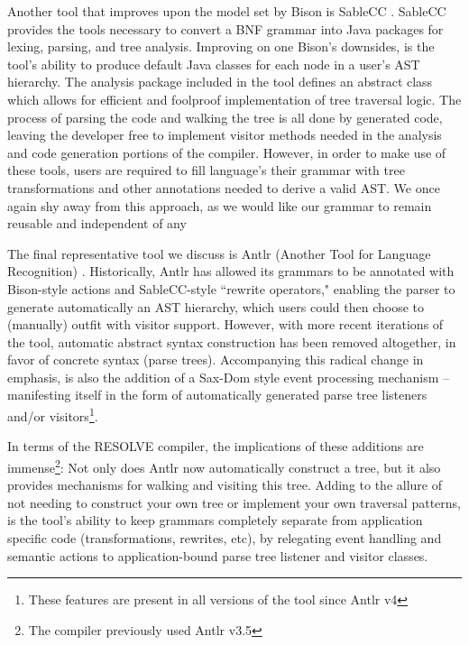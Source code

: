 \documentclass[times]{speauth}
\begin{document}
Another tool that improves upon the model set by Bison is SableCC \cite{gagnon:1998}. SableCC provides the tools necessary to convert a BNF grammar into Java packages for lexing, parsing, and tree analysis. Improving on one Bison's downsides, is the tool's ability to produce default Java classes for each node in a user's AST hierarchy. The analysis package included in the tool defines an abstract class which allows for efficient and foolproof implementation of tree traversal logic. The process of parsing the code and walking the tree is all done by generated code, leaving the developer free to implement visitor methods needed in the analysis and code generation portions of the compiler. However, in order to make use of these tools, users are required to fill language's their grammar with tree transformations and other annotations needed to derive a valid AST. We once again shy away from this approach, as we would like our grammar to remain reusable and independent of any


The final representative tool we discuss is Antlr (Another Tool for Language Recognition) \cite{parr:2011}. Historically, Antlr has allowed its grammars to be annotated with Bison-style actions and SableCC-style ``rewrite operators," enabling the parser to generate automatically an AST hierarchy, which users could then choose to (manually) outfit with visitor support. However, with more recent iterations of the tool, automatic abstract syntax construction has been removed altogether, in favor of concrete syntax (parse trees). Accompanying this radical change in emphasis, is also the addition of a Sax-Dom style event processing mechanism -- manifesting itself in the form of automatically generated parse tree listeners and/or visitors\footnote{These features are present in all versions of the tool since Antlr v4}. 

In terms of the RESOLVE compiler, the implications of these additions are immense\footnote{The compiler previously used Antlr v3.5}: Not only does Antlr now automatically construct a tree, but it also provides mechanisms for walking and visiting this tree. Adding to the allure of not needing to construct your own tree or implement your own traversal patterns, is the tool's ability to keep grammars completely separate from application specific code (transformations, rewrites, etc), by relegating event handling and semantic actions to application-bound parse tree listener and visitor classes. 
\end{document}
